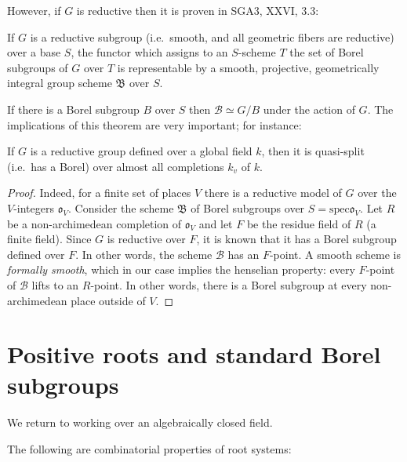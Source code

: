 However, if $G$ is reductive then it is proven in SGA3, XXVI, 3.3:
\begin{theorem}
If $G$ is a reductive subgroup (i.e.\ smooth, and all geometric fibers are reductive) over a base $S$, the functor which assigns to an $S$-scheme $T$ the set of Borel subgroups of $G$ over $T$ is representable by a smooth, projective, geometrically integral group scheme $\mathfrak B$ over $S$.  
\end{theorem}

If there is a Borel subgroup $B$ over $S$ then $\mathcal B\simeq G/B$ under the action of $G$. The implications of this theorem are very important; for instance:

\begin{proposition} If $G$ is a reductive group defined over a global field $k$, then it is quasi-split (i.e.\ has a Borel) over almost all completions $k_v$ of $k$. 
\end{proposition}

\begin{proof} 
Indeed, for a finite set of places $V$ there is a reductive model of $G$ over the $V$-integers $\mathfrak o_V$. Consider the scheme $\mathfrak B$ of Borel subgroups over $S=\text{spec} \mathfrak o_V$. Let $R$ be a non-archimedean completion of $\mathfrak o_V$ and let $F$ be the residue field of $R$ (a finite field). Since $G$ is reductive over $F$, it is known that it has a Borel subgroup defined over $F$. In other words, the scheme $\mathcal B$ has an $F$-point. A smooth scheme is \emph{formally smooth}, which in our case implies the henselian property: every $F$-point of $\mathcal B$ lifts to an $R$-point. In other words, there is a Borel subgroup at every non-archimedean place outside of $V$.
\end{proof}


\section{Positive roots and standard Borel subgroups}

We return to working over an algebraically closed field. 

The following are combinatorial properties of root systems:

